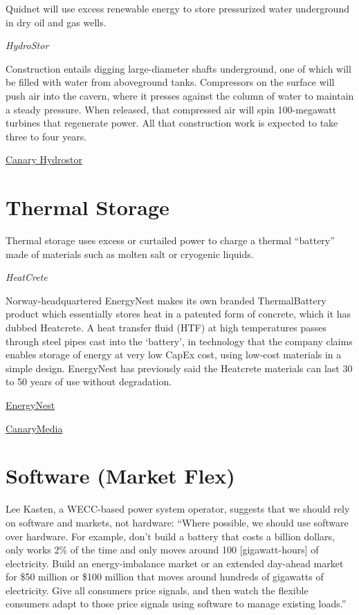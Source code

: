\documentclass[
]{book}
\begin{document}
Quidnet will use excess renewable energy to store pressurized water underground in dry oil and gas wells.

\emph{HydroStor}

Construction entails digging large-diameter shafts underground, one of which will be filled with water from aboveground tanks. Compressors on the surface will push air into the cavern, where it presses against the column of water to maintain a steady pressure. When released, that compressed air will spin 100-megawatt turbines that regenerate power. All that construction work is expected to take three to four years.

\href{https://www.canarymedia.com/articles/hydrostor-is-developing-truly-massive-grid-storage-in-watery-caverns/}{Canary Hydrostor}

\hypertarget{thermal-storage}{%
\section{Thermal Storage}\label{thermal-storage}}

Thermal storage uses excess or curtailed power to charge a thermal ``battery'' made of materials such as molten salt or cryogenic liquids.

\emph{HeatCrete}

Norway-headquartered EnergyNest makes its own branded ThermalBattery product which essentially stores heat in a patented form of concrete, which it has dubbed Heatcrete. A heat transfer fluid (HTF) at high temperatures passes through steel pipes cast into the `battery', in technology that the company claims enables storage of energy at very low CapEx cost, using low-cost materials in a simple design. EnergyNest has previously said the Heatcrete materials can last 30 to 50 years of use without degradation.

\href{https://energy-nest.com/}{EnergyNest}

\href{https://www.energy-storage.news/news/thermal-energy-storage-startup-energynest-secures-us130-million-investment?utm_source=newsletter\&utm_medium=email\&utm_campaign=canary}{CanaryMedia}

\hypertarget{software-market-flex}{%
\section{Software (Market Flex)}\label{software-market-flex}}

Lee Kasten, a WECC-based power system operator, suggests that we should rely on software and markets, not hardware: ``Where possible, we should use software over hardware. For example, don't build a battery that costs a billion dollars, only works 2\% of the time and only moves around 100 {[}gigawatt-hours{]} of electricity. Build an energy-imbalance market or an extended day-ahead market for \$50 million or \$100 million that moves around hundreds of gigawatts of electricity. Give all consumers price signals, and then watch the flexible consumers adapt to those price signals using software to manage existing loads.''
\end{document}
